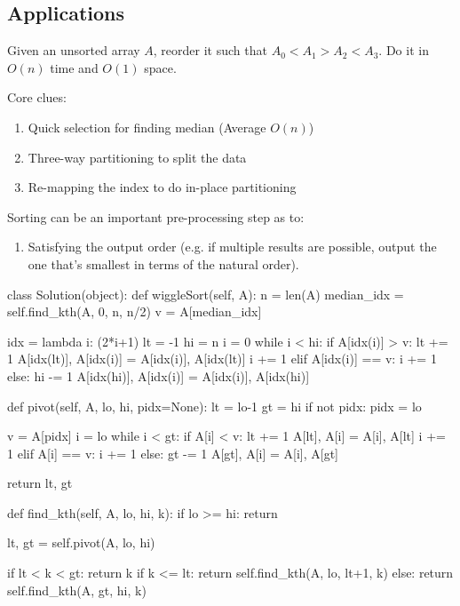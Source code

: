 \subsection{Applications}
 Given an unsorted array $A$, reorder it such that $A_0 < A_1 > A_2 < A_3$. Do it in $O(n)$ time and $O(1)$ space. 

Core clues:
\begin{enumerate}
\item Quick selection for finding median (Average $O(n)$)
\item Three-way partitioning to split the data
\item Re-mapping the index to do in-place partitioning
\end{enumerate}

 Sorting can be an important pre-processing step as to:
\begin{enumerate}
\item Satisfying the output order (e.g. if multiple results are possible, output the one that's smallest in terms of the natural order). 
\end{enumerate}

\begin{python}
class Solution(object):
  def wiggleSort(self, A):
    n = len(A)
    median_idx = self.find_kth(A, 0, n, n/2)
    v = A[median_idx]
    
    idx = lambda i: (2*i+1)%
    lt = -1
    hi = n
    i = 0
    while i < hi:
      if A[idx(i)] > v:
        lt += 1
        A[idx(lt)], A[idx(i)] = A[idx(i)], A[idx(lt)]
        i += 1
      elif A[idx(i)] == v:
        i += 1
      else:
        hi -= 1
        A[idx(hi)], A[idx(i)] = A[idx(i)], A[idx(hi)]

  def pivot(self, A, lo, hi, pidx=None):
    lt = lo-1
    gt = hi
    if not pidx: pidx = lo

    v = A[pidx]
    i = lo
    while i < gt:
      if A[i] < v:
        lt += 1
        A[lt], A[i] = A[i], A[lt]
        i += 1
      elif A[i] == v:
        i += 1
      else:
        gt -= 1
        A[gt], A[i] = A[i], A[gt]

    return lt, gt

  def find_kth(self, A, lo, hi, k):
    if lo >= hi: return

    lt, gt = self.pivot(A, lo, hi)
    
    if lt < k < gt:
      return k
    if k <= lt:
      return self.find_kth(A, lo, lt+1, k)
    else:
      return self.find_kth(A, gt, hi, k)
\end{python}

